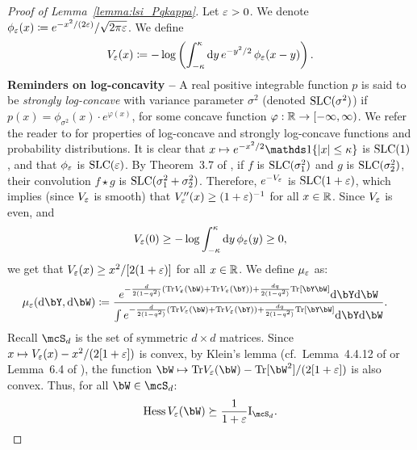 \begin{proof}[Proof of Lemma~\ref{lemma:lsi_Pqkappa}]
    Let $\varepsilon > 0$. We denote $\phi_\varepsilon(x) \coloneqq e^{-x^2/(2\varepsilon)}/\sqrt{2\pi\varepsilon}$.
    We define 
    \begin{equation*}
        V_\varepsilon(x) \coloneqq - \log \left(\int_{-\kappa}^\kappa \mathrm{d} y \, e^{-y^2/2} \, \phi_\varepsilon(x-y)\right).
    \end{equation*}
    \noindent
    \textbf{Reminders on log-concavity --} 
    A real positive integrable function $p$ is said to be \emph{strongly log-concave} with variance parameter $\sigma^2$ (denoted ${\rm SLC}(\sigma^2)$)
    if $p(x) = \phi_{\sigma^2}(x) \cdot e^{\varphi(x)}$, for some concave function $\varphi : \mathbb{R} \to [-\infty, \infty)$.
    We refer the reader to \cite{saumard2014log} for properties of log-concave and strongly log-concave functions and probability distributions.
    It is clear that $x \mapsto e^{-x^2/2} \indi\{|x| \leq \kappa\}$ is ${\rm SLC}(1)$,
    and that $\phi_\varepsilon$ is ${\rm SLC}(\varepsilon)$. 
    By Theorem~3.7 of \cite{saumard2014log}, if $f$ is ${\rm SLC}(\sigma_1^2)$ and $g$ is ${\rm SLC}(\sigma_2^2)$, 
    their convolution $f \star g$ is ${\rm SLC}(\sigma_1^2+\sigma_2^2)$. 
    Therefore, $e^{-V_\varepsilon}$ is ${\rm SLC}(1 + \varepsilon)$, which implies (since $V_\varepsilon$ is smooth) 
    that $V_\varepsilon''(x) \geq (1+\varepsilon)^{-1}$ for all $x \in \mathbb{R}$. Since $V_\varepsilon$ is even,
    and 
    \begin{equation*}
        V_\varepsilon(0) \geq - \log \int_{-\kappa}^\kappa \mathrm{d} y \, \phi_\varepsilon(y) \geq 0,
    \end{equation*}
    we get that $V_\varepsilon(x) \geq x^2/[2(1+\varepsilon)]$ for all $x \in \mathbb{R}$.
    We define $\mu_\varepsilon$ as:
    \begin{align}\label{eq:def_mueps}
    \mu_\eps(\rd \bY, \rd \bW) &\coloneqq \frac{e^{-\frac{d}{2(1-q^2)} (\Tr V_\eps(\bW) + \Tr V_\eps(\bY)) + \frac{dq}{2(1-q^2)} \Tr[\bY \bW]} \rd \bY \rd \bW}{\int e^{-\frac{d}{2(1-q^2)} (\Tr V_\eps(\bW) + \Tr V_\eps(\bY)) + \frac{dq}{2(1-q^2)} \Tr[\bY \bW]} \rd \bY \rd \bW}.
    \end{align} 
    Recall $\mcS_d$ is the set of symmetric $d \times d$ matrices.
    Since $x \mapsto V_\varepsilon(x) - x^2/(2[1+\varepsilon])$ is convex, by Klein's lemma (cf.\ Lemma~4.4.12 of \cite{anderson2010introduction} or Lemma~6.4 of \cite{guionnet2009large}), the function 
    $\bW \mapsto \Tr V_\eps(\bW) - \Tr[\bW^2]/(2[1+\eps])$ is also convex. 
    Thus, for all $\bW \in \mcS_d$: 
    \begin{align*}
        \Hess \, V_\eps(\bW) \succeq \frac{1}{1+\eps} \Id_{\mcS_d}.

\end{align*}
\end{proof}
